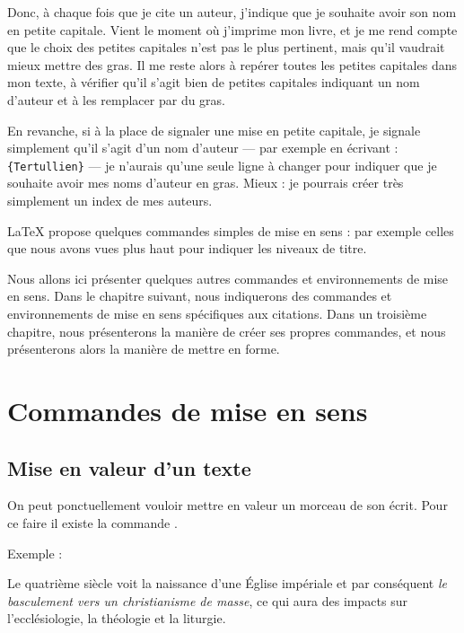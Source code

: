 Donc, à chaque fois que je cite un auteur, j'indique que je souhaite avoir son nom en petite capitale.
Vient le moment où j'imprime mon livre, et je me rend compte que le choix des petites capitales n'est pas le plus pertinent, mais qu'il vaudrait mieux mettre des gras. Il me reste alors à repérer toutes les petites capitales dans mon texte, à vérifier qu'il s'agit bien de petites capitales indiquant un nom d'auteur et à les remplacer par du gras.

En revanche, si à la place de signaler une mise en petite capitale, je signale simplement  qu'il s'agit d'un nom d'auteur --- par exemple en écrivant : \verb|{Tertullien}| --- je n'aurais qu'une seule ligne à changer pour indiquer que je souhaite avoir mes noms d'auteur en gras. Mieux : je pourrais créer très simplement un index de mes auteurs.

LaTeX propose quelques commandes simples de mise en sens  : par exemple celles que nous avons vues plus haut pour indiquer les niveaux de titre.

Nous allons ici présenter quelques autres commandes et environnements de mise en sens. Dans le chapitre suivant, nous indiquerons des commandes et environnements de mise en sens spécifiques aux citations. Dans un troisième chapitre, nous présenterons la manière de créer ses propres commandes, et nous présenterons alors la manière de mettre en forme.

\section{Commandes de mise en sens}

\subsection{Mise en valeur d'un texte}

On peut ponctuellement vouloir mettre en valeur un morceau de son écrit. Pour ce faire il existe la commande .

Exemple :

\begin{latexcode}
Le quatrième siècle voit la naissance d'une Église impériale
et par conséquent \emph{le basculement vers un christianisme de masse},
ce qui aura des impacts sur l'ecclésiologie, la théologie et la liturgie.
\end{latexcode}

